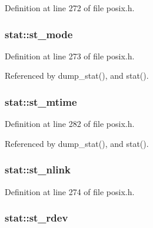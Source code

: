Definition at line 272 of file posix.\+h.

\subsubsection[{\texorpdfstring{st\+\_\+mode}{st_mode}}]{ stat\+::st\+\_\+mode}\hypertarget{structstat_a5cbdd829011af82ba61e83773bbcbc7d}{}\label{structstat_a5cbdd829011af82ba61e83773bbcbc7d}


Definition at line 273 of file posix.\+h.



Referenced by dump\+\_\+stat(), and stat().

\subsubsection[{\texorpdfstring{st\+\_\+mtime}{st_mtime}}]{ stat\+::st\+\_\+mtime}\hypertarget{structstat_a77e235090f8cb6897f1c0ce65689006b}{}\label{structstat_a77e235090f8cb6897f1c0ce65689006b}


Definition at line 282 of file posix.\+h.



Referenced by dump\+\_\+stat(), and stat().

\subsubsection[{\texorpdfstring{st\+\_\+nlink}{st_nlink}}]{ stat\+::st\+\_\+nlink}\hypertarget{structstat_a0ed9092fa6c77a3251b9b9a4738ef84f}{}\label{structstat_a0ed9092fa6c77a3251b9b9a4738ef84f}


Definition at line 274 of file posix.\+h.

\subsubsection[{\texorpdfstring{st\+\_\+rdev}{st_rdev}}]{ stat\+::st\+\_\+rdev}\hypertarget{structstat_aa61e6c1a8a91c69f1d26f6700a0546cb}{}\label{structstat_aa61e6c1a8a91c69f1d26f6700a0546cb}


